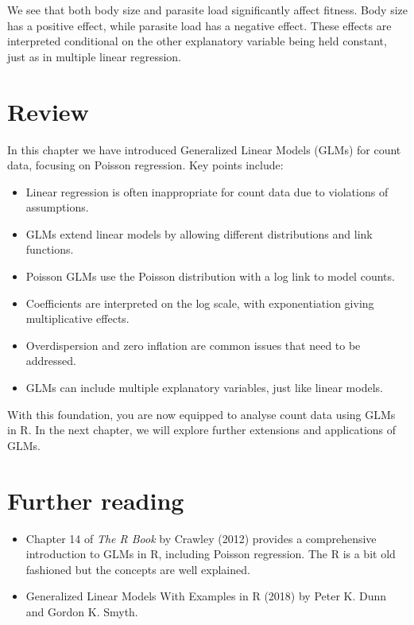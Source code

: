 \documentclass[
  letterpaper,
  8pt,
  a4paper]{book}
\providecommand{\tightlist}{%
  \setlength{\itemsep}{0pt}\setlength{\parskip}{0pt}}
\begin{document}
We see that both body size and parasite load significantly affect
fitness. Body size has a positive effect, while parasite load has a
negative effect. These effects are interpreted conditional on the other
explanatory variable being held constant, just as in multiple linear
regression.

\section*{Review}\label{review-6}


In this chapter we have introduced Generalized Linear Models (GLMs) for
count data, focusing on Poisson regression. Key points include:

\begin{itemize}
\tightlist
\item
  Linear regression is often inappropriate for count data due to
  violations of assumptions.
\item
  GLMs extend linear models by allowing different distributions and link
  functions.
\item
  Poisson GLMs use the Poisson distribution with a log link to model
  counts.
\item
  Coefficients are interpreted on the log scale, with exponentiation
  giving multiplicative effects.
\item
  Overdispersion and zero inflation are common issues that need to be
  addressed.
\item
  GLMs can include multiple explanatory variables, just like linear
  models.
\end{itemize}

With this foundation, you are now equipped to analyse count data using
GLMs in R. In the next chapter, we will explore further extensions and
applications of GLMs.

\section*{Further reading}\label{further-reading-6}


\begin{itemize}
\tightlist
\item
  Chapter 14 of \emph{The R Book} by Crawley (2012) provides a
  comprehensive introduction to GLMs in R, including Poisson regression.
  The R is a bit old fashioned but the concepts are well explained.
\item
  Generalized Linear Models With Examples in R (2018) by Peter K. Dunn
  and Gordon K. Smyth.
\end{itemize}
\end{document}
